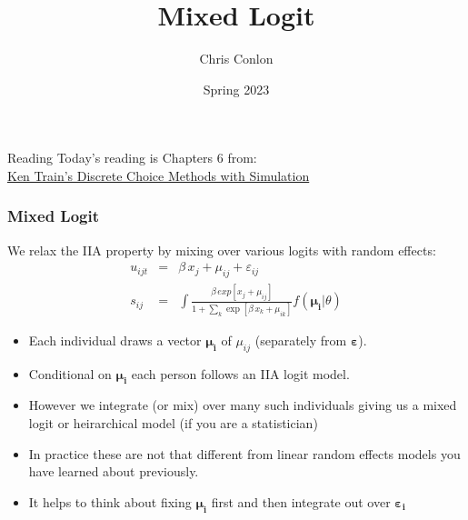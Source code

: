 

\title{Mixed Logit}
\author{Chris Conlon}

\date{Spring 2023}








\begin{frame}[plain] %
\titlepage
\end{frame}


\begin{frame}{Reading}
Today's reading is Chapters 6 from:\\
\href{https://eml.berkeley.edu/books/choice2.html}{Ken Train's Discrete Choice Methods with Simulation}
\end{frame}


\begin{frame}
\frametitle{Mixed Logit}
We relax the IIA property by mixing over various logits with \alert{random effects}:
\begin{eqnarray*}
u_{ijt} &=& \beta \, x_j + \mu_{ij} + \varepsilon_{ij} \\
s_{ij} &=& \int \frac{\beta \, exp[x_{j} + \mu_{ij} ]}{1+\sum_k \exp[ \beta  \, x_{k}+ \mu_{ik} ]} f(\boldsymbol{\mu_i} | \theta)
\end{eqnarray*}
 \begin{itemize}
 \item Each individual draws a vector $\boldsymbol{\mu_i}$ of $\mu_{ij}$ (separately from $\boldsymbol{\varepsilon}$).
 \item Conditional on $\boldsymbol{\mu_i}$ each person follows an IIA logit model.
 \item However we integrate (or mix) over many such individuals giving us a \alert{mixed logit} or \alert{heirarchical model} (if you are a statistician)
 \item In practice these are not that different from linear \alert{random effects models} you have learned about previously.
 \item It helps to think about fixing $\boldsymbol{\mu_i}$ first and then integrate out over $\boldsymbol{\varepsilon_i}$
 \end{itemize}
\end{frame}

